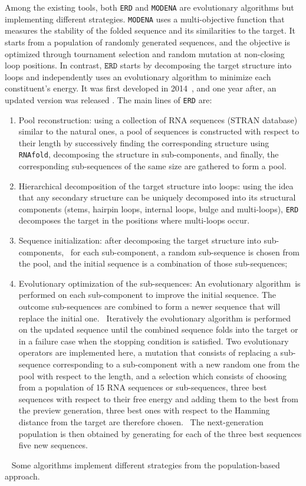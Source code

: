Among the existing tools, both \texttt{ERD} \cite{esmaili2014evolutionary, esmaili2015erd} and \texttt{MODENA} \cite{modena_2012} are evolutionary algorithms but implementing different strategies. \texttt{MODENA} uses a multi-objective function that measures the stability of the folded sequence and its similarities to the target. It starts from a population of randomly generated sequences, and the objective is optimized through tournament selection and random mutation at non-closing loop positions. In contrast, \(\texttt{ERD}\) starts by decomposing the target structure into loops and independently uses an evolutionary algorithm to minimize each constituent's energy. It was first developed in 2014 \cite{esmaili2014evolutionary}, and one year after, an updated version was released \cite{esmaili2015erd}. The main lines of \texttt{ERD} are:
\begin{enumerate}
\item Pool reconstruction: using a collection of RNA sequences (STRAN database) similar to the natural ones, a pool of sequences is constructed with respect to their length by successively finding the corresponding structure using \texttt{RNAfold}, decomposing the structure in sub-components, and finally, the corresponding sub-sequences of the same size are gathered to form a pool. 
\item Hierarchical decomposition of the target structure into loops: using the idea that any secondary structure can be uniquely decomposed into its structural components (stems, hairpin loops, internal loops, bulge and multi-loops), \texttt{ERD} decomposes the target in the positions where multi-loops occur. 
\item Sequence initialization: after decomposing the target structure into sub-components,  for each sub-component, a random sub-sequence is chosen from the pool, and the initial sequence is a combination of those sub-sequences; 
\item Evolutionary optimization of the sub-sequences: An evolutionary algorithm is performed on each sub-component to improve the initial sequence. The outcome sub-sequences are combined to form a newer sequence that will replace the initial one.  Iteratively the evolutionary algorithm is performed on the updated sequence until the combined sequence folds into the target or in a failure case when the stopping condition is satisfied. Two evolutionary operators are implemented here, a mutation that consists of replacing a sub-sequence corresponding to a sub-component with a new random one from the pool with respect to the length, and a selection which consists of choosing from a population of 15 RNA sequences or sub-sequences, three best sequences with respect to their free energy and adding them to the best from the preview generation, three best ones with respect to the Hamming distance from the target are therefore chosen.  The next-generation population is then obtained by generating for each of the three best sequences five new sequences.
\end{enumerate}
 
Some algorithms implement different strategies from the population-based approach. 

